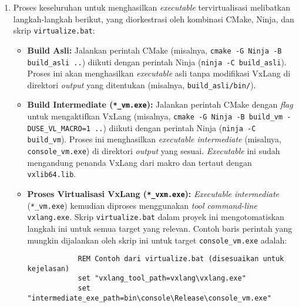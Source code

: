 \begin{enumerate}
\begin{listing}[H]
\begin{verbatim}
# Contoh logika CMake untuk target 'console'
# (Versi sederhana untuk ilustrasi)

# Target Asli (Non-VM)
add_executable(console src/console/console.cpp ...)
set_target_properties(console PROPERTIES OUTPUT_NAME "console")
# ... (tidak ada USE_VL_MACRO, tidak ada link ke vxlib64)

# Target Intermediate (untuk VxLang)
add_executable(console_vm_cmake_example src/console/console.cpp ...)
target_compile_definitions(console_vm_cmake_example PRIVATE USE_VL_MACRO)
target_link_libraries(console_vm_cmake_example PRIVATE vxlib64)
set_target_properties(console_vm_cmake_example PROPERTIES OUTPUT_NAME "console_vm")
\end{verbatim}
\label{lst:cmake_vxlang_integration_bab4}
\end{listing}

\item {} Proses keseluruhan untuk menghasilkan \textit{executable} tervirtualisasi melibatkan langkah-langkah berikut, yang diorkestrasi oleh kombinasi CMake, Ninja, dan skrip \texttt{virtualize.bat}:
    \begin{itemize}
        \item \textbf{Build Asli:} Jalankan perintah CMake (misalnya, \texttt{cmake -G Ninja -B build\_asli ..}) diikuti dengan perintah Ninja (\texttt{ninja -C build\_asli}). Proses ini akan menghasilkan \textit{executable} asli tanpa modifikasi VxLang di direktori \textit{output} yang ditentukan (misalnya, \texttt{build\_asli/bin/}).
        \item \textbf{Build Intermediate (\texttt{*\_vm.exe}):} Jalankan perintah CMake dengan \textit{flag} untuk mengaktifkan VxLang (misalnya, \texttt{cmake -G Ninja -B build\_vm -DUSE\_VL\_MACRO=1 ..}) diikuti dengan perintah Ninja (\texttt{ninja -C build\_vm}). Proses ini menghasilkan \textit{executable intermediate} (misalnya, \texttt{console\_vm.exe}) di direktori \textit{output} yang sesuai. \textit{Executable} ini sudah mengandung penanda VxLang dari makro dan tertaut dengan \texttt{vxlib64.lib}.
        \item \textbf{Proses Virtualisasi VxLang (\texttt{*\_vxm.exe}):} \textit{Executable intermediate} (\texttt{*\_vm.exe}) kemudian diproses menggunakan \textit{tool command-line} \texttt{vxlang.exe}. Skrip \texttt{virtualize.bat} dalam proyek ini mengotomatiskan langkah ini untuk semua target yang relevan. Contoh baris perintah yang mungkin dijalankan oleh skrip ini untuk target \texttt{console\_vm.exe} adalah:
            \begin{listing}[H]
            \begin{verbatim}
            REM Contoh dari virtualize.bat (disesuaikan untuk kejelasan)
            set "vxlang_tool_path=vxlang\vxlang.exe"
            set "intermediate_exe_path=bin\console\Release\console_vm.exe"
            

\end{verbatim}
\end{listing}
\end{itemize}
\end{enumerate}
